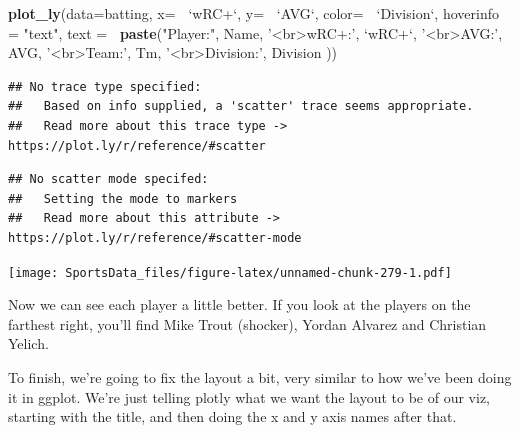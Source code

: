 \documentclass[]{book}
\newenvironment{Shaded}{\begin{snugshade}}{\end{snugshade}}
\newcommand{\DataTypeTok}[1]{\textcolor[rgb]{0.13,0.29,0.53}{#1}}
\newcommand{\KeywordTok}[1]{\textcolor[rgb]{0.13,0.29,0.53}{\textbf{#1}}}
\newcommand{\NormalTok}[1]{#1}
\newcommand{\OperatorTok}[1]{\textcolor[rgb]{0.81,0.36,0.00}{\textbf{#1}}}
\newcommand{\StringTok}[1]{\textcolor[rgb]{0.31,0.60,0.02}{#1}}
\begin{document}
\begin{Shaded}
\begin{Highlighting}[]
\KeywordTok{plot_ly}\NormalTok{(}\DataTypeTok{data=}\NormalTok{batting, }\DataTypeTok{x=} \OperatorTok{~}\StringTok{`}\DataTypeTok{wRC+}\StringTok{`}\NormalTok{, }\DataTypeTok{y=} \OperatorTok{~}\StringTok{`}\DataTypeTok{AVG}\StringTok{`}\NormalTok{, }\DataTypeTok{color=} \OperatorTok{~}\StringTok{`}\DataTypeTok{Division}\StringTok{`}\NormalTok{,}
        \DataTypeTok{hoverinfo =} \StringTok{"text"}\NormalTok{,}
        \DataTypeTok{text =} \OperatorTok{~}\KeywordTok{paste}\NormalTok{(}\StringTok{"Player:"}\NormalTok{, Name,}
                      \StringTok{'<br>wRC+:'}\NormalTok{, }\StringTok{`}\DataTypeTok{wRC+}\StringTok{`}\NormalTok{,}
                      \StringTok{'<br>AVG:'}\NormalTok{, AVG,}
                      \StringTok{'<br>Team:'}\NormalTok{, Tm,}
                      \StringTok{'<br>Division:'}\NormalTok{, Division}
\NormalTok{                      ))}
\end{Highlighting}
\end{Shaded}

\begin{verbatim}
## No trace type specified:
##   Based on info supplied, a 'scatter' trace seems appropriate.
##   Read more about this trace type -> https://plot.ly/r/reference/#scatter
\end{verbatim}

\begin{verbatim}
## No scatter mode specifed:
##   Setting the mode to markers
##   Read more about this attribute -> https://plot.ly/r/reference/#scatter-mode
\end{verbatim}

\texttt{[image: SportsData\_files/figure-latex/unnamed-chunk-279-1.pdf]}

Now we can see each player a little better. If you look at the players on the farthest right, you'll find Mike Trout (shocker), Yordan Alvarez and Christian Yelich.

To finish, we're going to fix the layout a bit, very similar to how we've been doing it in ggplot. We're just telling plotly what we want the layout to be of our viz, starting with the title, and then doing the x and y axis names after that.
\end{document}
